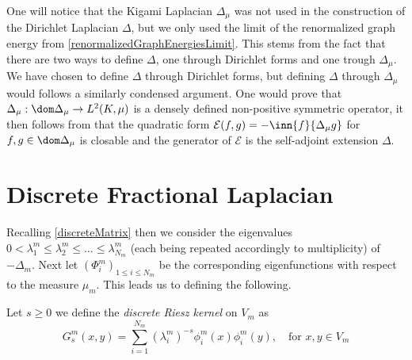 One will notice that the Kigami Laplacian $\Delta_{\mu}$ was not used in the construction of the Dirichlet Laplacian $\Delta$, but we only used the limit of the renormalized graph energy from \cref{renormalizedGraphEnergiesLimit}. This stems from the fact that there are two ways to define $\Delta$, one through Dirichlet forms and one trough $\Delta_{\mu}$. We have chosen to define $\Delta$ through Dirichlet forms, but defining $\Delta$ through $\Delta_{\mu}$ would follows a similarly condensed argument. One would prove that $\Delta_{\mu}: \dom \Delta_\mu \to L^{2}(K, \mu)$ is a densely defined non-positive symmetric operator, it then follows from \cite[Lemma 1.3.5]{fabriceDirichelt} that the quadratic form $\mathcal{E}(f,g) = -\inn{f}{\Delta_{\mu} g}$ for $f,g \in \dom \Delta_{\mu}$ is closable and the generator of $\mathcal{E}$ is the self-adjoint extension $\Delta$.


\section{Discrete Fractional Laplacian}
Recalling \cref{discreteMatrix} then we consider the eigenvalues $0 < \lambda_1^{m} \leq \lambda_{2}^{m} \leq \ldots \leq \lambda_{N_m}^{m}$ (each being repeated accordingly to multiplicity) of $-\Delta_m$. Next let $(\Phi_i^{m})_{1 \leq i \leq N_m}$ be the corresponding eigenfunctions with respect to the measure $\mu_m$. This leads us to defining the following.

\begin{defi}
	Let $s \geq 0$ we define the \emph{discrete Riesz kernel} on $V_m$ as
	\begin{equation}
		G_s^{m}(x,y) = \sum_{i = 1}^{N_m} (\lambda_i^{m})^{-s} \phi_{i}^{m}(x)\phi_{i}^{m}(y), \quad \text{for }x, y \in V_m
	\end{equation}
\end{defi}

